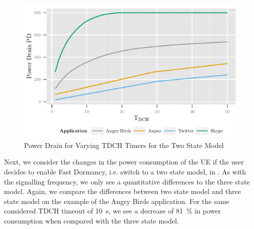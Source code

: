 \begin{figure}
	\centering
	\includegraphics{network/network_traces/numerical_results/figures/2_state_tdch_vs_power_drain}
	\caption{Power Drain for Varying \gls{TDCH} Timers for the Two State Model}\label{fig:network:network_traces:numerical_results:two_states:power_drain}
\end{figure}
Next, we consider the changes in the power consumption of the \gls{UE} if the user decides to enable Fast Dormancy, i.e. switch to a two state model, in .
As with the signalling frequency, we only see a quantitative differences to the three state model.
Again, we compare the differences between two state model and three state model on the example of the Angry Birds application.
For the same considered \gls{TDCH} timeout of \SI{10}{\second}, we see a decrease of \SI{81}{\percent} in power consumption when compared with the three state model.


